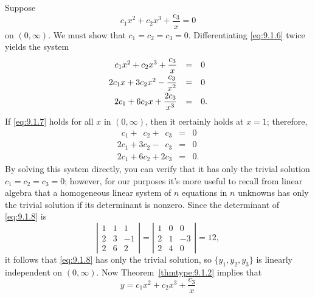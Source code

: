 \begin{examplesolution}
\solution Suppose
\begin{equation}
  \label{eq:9.1.6}c_{1}x^{2}+c_{2}x^{3}+\frac{c_{3}}{x}=0
\end{equation}
on $(0,\infty)$. We must show that $c_{1}=c_{2}=c_{3}=0$. Differentiating \eqref{eq:9.1.6} twice
yields the system
\begin{equation}
  \label{eq:9.1.7}
  \begin{array}{rcl}
    c_{1}x^{2}+c_{2}x^{3}+\displaystyle\frac{c_{3}}{x}   & = & 0  \\[2\jot]
    2c_{1}x+3c_{2}x^{2}-\displaystyle\frac{c_{3}}{x^{2}} & = & 0  \\[2\jot]
    2c_{1}+6c_{2}x+\displaystyle\frac{2c_{3}}{x^{3}}     & = & 0.
  \end{array}
\end{equation}
If \eqref{eq:9.1.7} holds for all $x$ in $(0,\infty)$, then it certainly holds at $x=1$; therefore,
\begin{equation}
  \label{eq:9.1.8}
  \begin{array}{rcl}
    \phantom{2}c_{1}+\phantom{3}c_{2}+\phantom{2}c_{3} & = & 0  \\
    2c_{1}+3c_{2}-\phantom{2}c_{3}                     & = & 0  \\
    2c_{1}+6c_{2}+2c_{3}                               & = & 0.
  \end{array}
\end{equation}
By solving this system directly, you can verify that it has only the trivial solution
$c_{1}=c_{2}=c_{3}=0$; however, for our purposes it's more useful to recall from linear algebra that
a homogeneous linear system of $n$ equations in $n$ unknowns has only the trivial solution if its
determinant is nonzero. Since the determinant of \eqref{eq:9.1.8} is
\[
  \left|
  \begin{array}{rrr}
    1 & 1 & 1  \\
    2 & 3 & -1 \\
    2 & 6 & 2
  \end{array}\right|= \left|
  \begin{array}{rrr}
    1 & 0 & 0  \\
    2 & 1 & -3 \\
    2 & 4 & 0
  \end{array}\right|=12,
\]
it follows that \eqref{eq:9.1.8} has only the trivial solution, so $\{y_{1},y_{2},y_{3}\}$ is
linearly independent on $(0,\infty)$. Now Theorem~\ref{thmtype:9.1.2} implies that
\[
  y=c_{1}x^{2}+c_{2}x^{3}+\frac{c_{3}}{x}
\]
\end{examplesolution}
